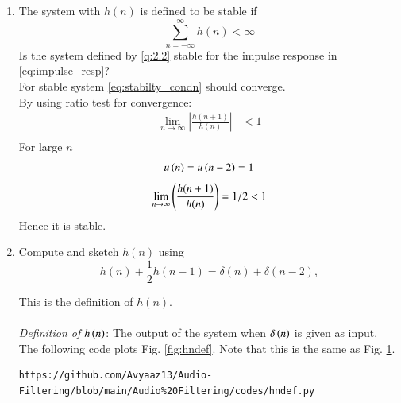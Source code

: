 \documentclass[journal,12pt,twocolumn]{IEEEtran}
\theoremstyle{remark}
\renewcommand\thesection{\arabic{section}}
\numberwithin{equation}{subsection}
\begin{document}
\begin{enumerate}[label=\thesection.\arabic*]
\begin{figure}[!ht]
\label{fig:hn}
\end{figure}
\newpage
\item The system with $h(n)$ is defined to be stable if
\begin{equation}
\sum_{n=-\infty}^{\infty}h(n) < \infty \label{eq:stabilty_condn}
\end{equation}
Is the system defined by \eqref{q:2.2} stable for the impulse response in \eqref{eq:impulse_resp}?\\
\solution For stable system \eqref{eq:stabilty_condn} should converge.\\
By using ratio test for convergence:
\begin{align}
    \lim_{n \to \infty}\left|\frac{h(n + 1)}{h(n)}\right|&<1 \\
\end{align}
For large $n$ 
\begin{align}
    u\left(n\right)=u\left(n-2\right)=1
\end{align}
\begin{align}
  \lim_{n \to \infty}  \left(\frac{h(n + 1)}{h(n)}\right) = 1/2 <1
\end{align}
Hence it is stable.
\item 
Compute and sketch $h(n)$ using 
\begin{equation}
\label{eq:iir_filter_h}
h(n) + \frac{1}{2}h(n-1) = \delta(n) + \delta(n-2), 
\end{equation}

This is the definition of $h(n)$.
\\
\solution\\
{\em Definition of $h\left(n\right)$}: The output of the system when $\delta\left(n\right)$ is given as input.\\

The following code plots Fig. \ref{fig:hndef}. Note that this is the same as Fig. 
\ref{fig:hn}. 

\begin{lstlisting}
https://github.com/Avyaaz13/Audio-Filtering/blob/main/Audio%20Filtering/codes/hndef.py
\end{lstlisting}


\end{enumerate}
\end{document}
